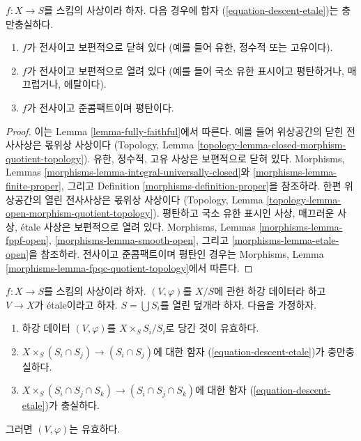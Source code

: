 \begin{lemma}
\label{lemma-fully-faithful-cases}
$f : X \to S$를 스킴의 사상이라 하자. 다음 경우에 함자
(\ref{equation-descent-etale})는 충만충실하다.
\begin{enumerate}
\item $f$가 전사이고 보편적으로 닫혀 있다
(예를 들어 유한, 정수적 또는 고유이다).
\item $f$가 전사이고 보편적으로 열려 있다
(예를 들어 국소 유한 표시이고 평탄하거나, 매끄럽거나, 에탈이다).
\item $f$가 전사이고 준콤팩트이며 평탄이다.
\end{enumerate}
\end{lemma}

\begin{proof}
이는 Lemma \ref{lemma-fully-faithful}에서 따른다.
예를 들어 위상공간의 닫힌 전사사상은 몫위상 사상이다
(Topology, Lemma
\ref{topology-lemma-closed-morphism-quotient-topology}).
유한, 정수적, 고유 사상은 보편적으로 닫혀 있다.
Morphisms, Lemmas \ref{morphisms-lemma-integral-universally-closed}와
\ref{morphisms-lemma-finite-proper}, 그리고 Definition
\ref{morphisms-definition-proper}을 참조하라.
한편 위상공간의 열린 전사사상은 몫위상 사상이다
(Topology, Lemma
\ref{topology-lemma-open-morphism-quotient-topology}).
평탄하고 국소 유한 표시인 사상, 매끄러운 사상, \'etale 사상은
보편적으로 열려 있다. Morphisms, Lemmas
\ref{morphisms-lemma-fppf-open},
\ref{morphisms-lemma-smooth-open}, 그리고
\ref{morphisms-lemma-etale-open}을 참조하라.
전사이고 준콤팩트이며 평탄인 경우는 Morphisms, Lemma
\ref{morphisms-lemma-fpqc-quotient-topology}에서 따른다.
\end{proof}

\begin{lemma}
\label{lemma-reduce-to-affine}
$f : X \to S$를 스킴의 사상이라 하자.
$(V, \varphi)$를 $X/S$에 관한 하강 데이터라 하고
$V \to X$가 \'etale이라고 하자.
$S = \bigcup S_i$를 열린 덮개라 하자. 다음을 가정하자.
\begin{enumerate}
\item 하강 데이터 $(V, \varphi)$를 $X \times_S S_i/S_i$로
당긴 것이 유효하다.
\item $X \times_S (S_i \cap S_j) \to (S_i \cap S_j)$에 대한
함자 (\ref{equation-descent-etale})가 충만충실하다.
\item $X \times_S (S_i \cap S_j \cap S_k) \to (S_i \cap S_j \cap S_k)$에
대한 함자 (\ref{equation-descent-etale})가 충실하다.
\end{enumerate}
그러면 $(V, \varphi)$는 유효하다.
\end{lemma}

